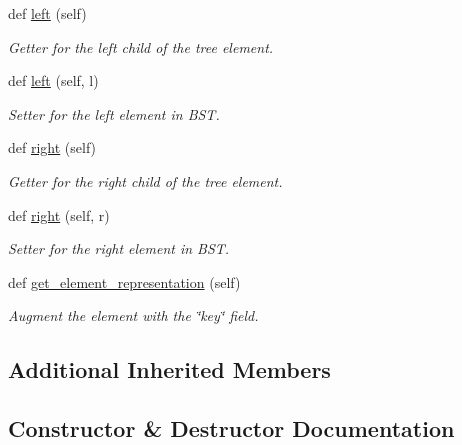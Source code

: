 \begin{DoxyCompactItemize}
$$def \mbox{\hyperlink{classbridges_1_1kd__tree__element_1_1_k_d_tree_element_afa4f059c61b3cd9460199c9835641db2}{left}} (self)
\begin{DoxyCompactList}\small\item\em Getter for the left child of the tree element. \end{DoxyCompactList}\item 
def \mbox{\hyperlink{classbridges_1_1kd__tree__element_1_1_k_d_tree_element_a784bad6511dae3a7c769672d2d3af14f}{left}} (self, l)
\begin{DoxyCompactList}\small\item\em Setter for the left element in B\+ST. \end{DoxyCompactList}\item 
def \mbox{\hyperlink{classbridges_1_1kd__tree__element_1_1_k_d_tree_element_acbcfa46ba613daaf922d8b632b795a86}{right}} (self)
\begin{DoxyCompactList}\small\item\em Getter for the right child of the tree element. \end{DoxyCompactList}\item 
def \mbox{\hyperlink{classbridges_1_1kd__tree__element_1_1_k_d_tree_element_a89071f192bee403a44f92c86a5fdc49d}{right}} (self, r)
\begin{DoxyCompactList}\small\item\em Setter for the right element in B\+ST. \end{DoxyCompactList}\item 
def \mbox{\hyperlink{classbridges_1_1kd__tree__element_1_1_k_d_tree_element_a4e08a6f2e4ff70be2b0dfd6eacdcf10e}{get\+\_\+element\+\_\+representation}} (self)
\begin{DoxyCompactList}\small\item\em Augment the element with the \char`\"{}key\char`\"{} field. \end{DoxyCompactList}\end{DoxyCompactItemize}
\subsection*{Additional Inherited Members}


\subsection{Constructor \& Destructor Documentation}
\mbox{\label{classbridges_1_1kd__tree__element_1_1_k_d_tree_element_ad48f0bdabbb21cf83782efc1f8dbc1ed}} 
